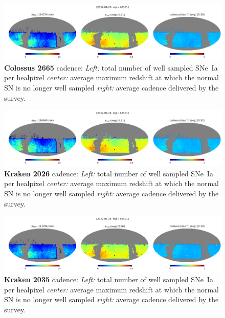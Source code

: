 \begin{figure}[h!]
  \begin{center}
    \includegraphics[width=\linewidth]{Figures/colossus_2665_64_maps.png}
    \caption{{\bf Colossus 2665} cadence: {\em Left:} total number of well
      sampled SNe~Ia per healpixel {\em center:} average maximum
      redshift at which the normal SN is no longer well sampled {\em
        right:} average cadence delivered by the survey.}
  \end{center}
\end{figure}

\begin{figure}[h!]
  \begin{center}
    \includegraphics[width=\linewidth]{Figures/kraken_2026_64_maps.png}
    \caption{{\bf Kraken 2026} cadence: {\em Left:} total number of well
      sampled SNe~Ia per healpixel {\em center:} average maximum
      redshift at which the normal SN is no longer well sampled {\em
        right:} average cadence delivered by the survey.}
  \end{center}
\end{figure}

\begin{figure}[h!]
  \begin{center}
    \includegraphics[width=\linewidth]{Figures/kraken_2035_64_maps.png}
    \caption{{\bf Kraken 2035} cadence: {\em Left:} total number of well
      sampled SNe~Ia per healpixel {\em center:} average maximum
      redshift at which the normal SN is no longer well sampled {\em
        right:} average cadence delivered by the survey.}
  \end{center}
\end{figure}

